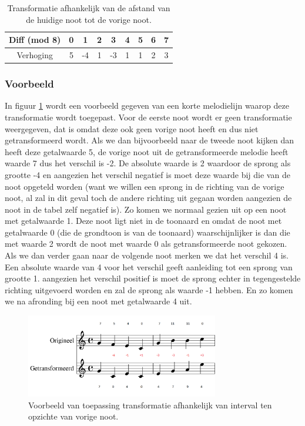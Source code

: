 \begin{table}
  \centering
  \begin{tabular}{c | c c c c c c c c }
    Diff (mod 8) & 0 & 1 & 2 & 3 & 4 & 5 & 6 & 7 \\
    \hline
    \hline
    Verhoging & 5 & -4 & 1 & -3 & 1 & 1 & 2 & 3 \\
  \end{tabular}
  \caption{Transformatie afhankelijk van de afstand van de huidige noot tot de vorige noot.}
  \label{tabel:transformatie2}
\end{table}

\subsubsection{Voorbeeld}
In figuur \ref{figuur:voorbeeld_transformatie_2} wordt een voorbeeld gegeven van een korte melodielijn waarop deze transformatie wordt toegepast. Voor de eerste noot wordt er geen transformatie weergegeven, dat is omdat deze ook geen vorige noot heeft en dus niet getransformeerd wordt. Als we dan bijvoorbeeld naar de tweede noot kijken dan heeft deze getalwaarde 5, de vorige noot uit de getransformeerde melodie heeft waarde 7 dus het verschil is -2. De absolute waarde is 2 waardoor de sprong als grootte -4 en aangezien het verschil negatief is moet deze waarde bij die van de noot opgeteld worden (want we willen een sprong in de richting van de vorige noot, al zal in dit geval toch de andere richting uit gegaan worden aangezien de noot in de tabel zelf negatief is). Zo komen we normaal gezien uit op een noot met getalwaarde 1. Deze noot ligt niet in de toonaard en omdat de noot met getalwaarde 0 (die de grondtoon is van de toonaard) waarschijnlijker is dan die met waarde 2 wordt de noot met waarde 0 als getransformeerde noot gekozen. Als we dan verder gaan naar de volgende noot merken we dat het verschil 4 is. Een absolute waarde van 4 voor het verschil geeft aanleiding tot een sprong van grootte 1. aangezien het verschil positief is moet de sprong echter in tegengestelde richting uitgevoerd worden en zal de sprong als waarde -1 hebben. En zo komen we na afronding bij een noot met getalwaarde 4 uit.

\begin{figure}[!ht]
  \centering
  \includegraphics[width=0.75\textwidth]{3_Melodische_Transformatie/transfo2}
  \caption{Voorbeeld van toepassing transformatie afhankelijk van interval ten opzichte van vorige noot.}
  \label{figuur:voorbeeld_transformatie_2}
\end{figure}

